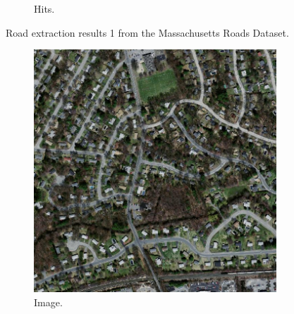 \begin{figure}[H]
\begin{subfigure}{0.23\textwidth}
\caption{Hits.}
\vspace{0.2cm} %
\end{subfigure}
\caption[Massachusetts Road extraction results 1]{Road extraction results 1 from the Massachusetts Roads Dataset.} \label{fiMass_app_results1}
\end{figure}

\begin{figure}[H]
\begin{subfigure}{0.23\textwidth}
\includegraphics[width=\textwidth]{figs/appendix/img20878930_15.jpg}
\caption{ Image. }
\vspace{0.2cm} %
\end{subfigure}
\hspace*{\fill} %
\begin{subfigure}{0.23\textwidth}

\end{subfigure}
\end{figure}
